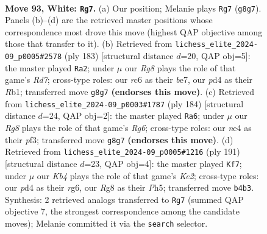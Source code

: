 \documentclass[11pt]{article}
\begin{document}
\clearpage

\begin{figure}[p]\centering
\begin{subfigure}{0.46\textwidth}\centering
\resizebox{\linewidth}{!}{%
\newchessgame
\chessboard[
  setfen={6R1/8/2r4p/4pk2/1K1pn2b/8/8/8 w - - 4 93},
  showmover=false,
  pgfstyle=straightmove, color=movearrow, markmove={g8-g7}
]}
\caption{}
\end{subfigure}\hfill
\begin{subfigure}{0.46\textwidth}\centering
\resizebox{\linewidth}{!}{%
\newchessgame
\chessboard[
  setfen={8/4B1k1/8/4P3/4KNB1/8/3r4/1r6 b - - 58 92},
  showmover=false,
  pgfstyle=straightmove, color=movearrow, markmove={d2-a2}
]}
\caption{}
\end{subfigure}
\\[4pt]
\begin{subfigure}{0.46\textwidth}\centering
\resizebox{\linewidth}{!}{%
\newchessgame
\chessboard[
  setfen={8/8/6R1/5p2/5k2/5p2/1r6/4K3 w - - 42 93},
  showmover=false,
  pgfstyle=straightmove, color=movearrow, markmove={g6-a6}
]}
\caption{}
\end{subfigure}\hfill
\begin{subfigure}{0.46\textwidth}\centering
\resizebox{\linewidth}{!}{%
\newchessgame
\chessboard[
  setfen={8/4k3/6R1/6Pp/4BK1P/8/8/2r5 b - - 0 96},
  showmover=false,
  pgfstyle=straightmove, color=movearrow, markmove={e7-f7}
]}
\caption{}
\end{subfigure}
\caption{\textbf{Move 93, White: \texttt{Rg7}.} (a) Our position; Melanie plays \texttt{Rg7} (\texttt{g8g7}). Panels (b)--(d) are the retrieved master positions whose correspondence most drove this move (highest QAP objective among those that transfer to it). (b) Retrieved from \texttt{lichess\_elite\_2024-09\_p0005\#2578} (ply 183) [structural distance $d$=20, QAP obj=5]: the master played \texttt{Ra2}; under $\mu$ our \emph{Rg8} plays the role of that game's \emph{Rd7}; cross-type roles: our \emph{r}c6 as their \emph{b}e7, our \emph{p}d4 as their \emph{R}b1; transferred move \texttt{g8g7} \textbf{(endorses this move)}. (c) Retrieved from \texttt{lichess\_elite\_2024-09\_p0003\#1787} (ply 184) [structural distance $d$=24, QAP obj=2]: the master played \texttt{Ra6}; under $\mu$ our \emph{Rg8} plays the role of that game's \emph{Rg6}; cross-type roles: our \emph{n}e4 as their \emph{p}f3; transferred move \texttt{g8g7} \textbf{(endorses this move)}. (d) Retrieved from \texttt{lichess\_elite\_2024-09\_p0005\#1216} (ply 191) [structural distance $d$=23, QAP obj=4]: the master played \texttt{Kf7}; under $\mu$ our \emph{Kb4} plays the role of that game's \emph{Ke2}; cross-type roles: our \emph{p}d4 as their \emph{r}g6, our \emph{R}g8 as their \emph{P}h5; transferred move \texttt{b4b3}. Synthesis: 2 retrieved analogs transferred to \texttt{Rg7} (summed QAP objective 7, the strongest correspondence among the candidate moves); Melanie committed it via the \texttt{search} selector.}
\label{fig:thought-m184}
\end{figure}
\end{document}

